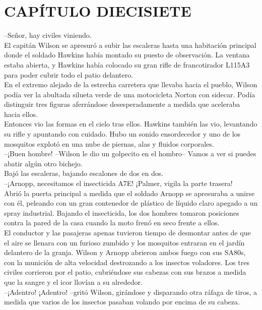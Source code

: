 \chapter*{CAPÍTULO DIECISIETE}
--Señor, hay civiles viniendo.\\
El capitán Wilson se apresuró a subir las escaleras hasta una habitación
principal donde el soldado Hawkins había montado su puesto de
observación. La ventana estaba abierta, y Hawkins había colocado su gran
rifle de francotirador L115A3 para poder cubrir todo el patio
delantero.\\
En el extremo alejado de la estrecha carretera que llevaba hacia el
pueblo, Wilson podía ver la abultada silueta verde de una motocicleta
Norton con sidecar. Podía distinguir tres figuras aferrándose
desesperadamente a medida que aceleraba hacia ellos.\\
Entonces vio las formas en el cielo tras ellos. Hawkins también las vio,
levantando su rifle y apuntando con cuidado. Hubo un sonido ensordecedor
y uno de los mosquitos explotó en una nube de piernas, alas y fluidos
corporales.\\
--¡Buen hombre! --Wilson le dio un golpecito en el hombro-- Vamos a ver
si puedes abatir algún otro bichejo.\\
Bajó las escaleras, bajando escalones de dos en dos.\\
--¡Arnopp, necesitamos el insecticida A7E! ¡Palmer, vigila la parte
trasera!\\
Abrió la puerta principal a medida que el soldado Arnopp se apresuraba a
unirse con él, peleando con un gran contenedor de plástico de líquido
claro apegado a un spray industrial. Bajando el insecticida, los dos
hombres tomaron posiciones contra la pared de la casa cuando la moto
frenó en seco frente a ellos.\\
El conductor y las pasajeras apenas tuvieron tiempo de desmontar antes
de que el aire se llenara con un furioso zumbido y los mosquitos
entraran en el jardín delantero de la granja. Wilson y Arnopp abrieron
ambos fuego con sus SA80s, con la munición de alta velocidad destrozando
a los insectos voladores. Los tres civiles corrieron por el patio,
cubriéndose sus cabezas con sus brazos a medida que la sangre y el icor
llovían a su alrededor.\\
--¡Adentro! ¡Adentro! --gritó Wilson, girándose y disparando otra ráfaga
de tiros, a medida que varios de los insectos pasaban volando por encima
de su cabeza.\\
